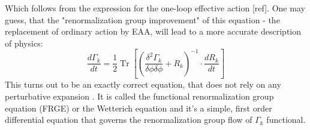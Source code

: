 \documentclass[11pt, a4paper]{article}
\begin{document}
Which follows from the expression for the one-loop effective action [ref]. 
One may guess, that the "renormalization group improvement" of this equation - the replacement of ordinary action by
 EAA, will lead to a more accurate description of physics:
\begin{equation}
    \frac{d \Gamma_k}{dt} = \frac{1}{2} \operatorname{Tr} \left[ \left(\frac{\delta^2 \Gamma_k}{\delta \phi \delta \phi} + R_k\right)^{-1} \cdot \frac{d R_k}{dt} \right]
    \label{FRGE}
\end{equation}
This turns out to be an exactly correct equation, that does not rely on any perturbative expansion \cite{wetteq}.
It is called the functional renormalization group equation (FRGE) or the Wetterich equation and
it's a simple, first order differential equation that governs the renormalization group flow of $\Gamma_k$ functional.
\end{document}
